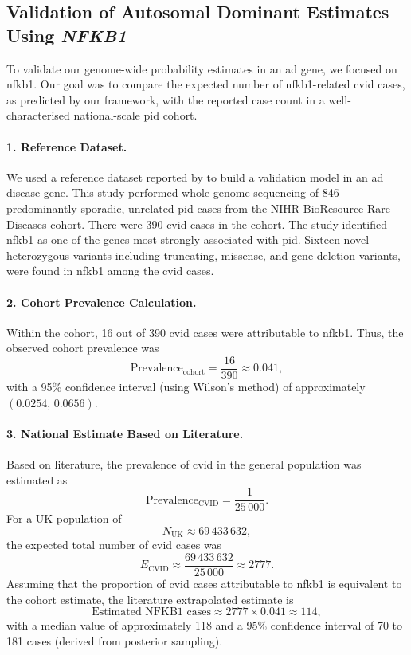 \subsection{Validation of Autosomal Dominant Estimates Using \textit{NFKB1}}

To validate our genome-wide probability estimates in an \ac{ad} gene, we focused on \ac{nfkb1}. Our goal was to compare the expected number of \ac{nfkb1}-related \ac{cvid} cases, as predicted by our framework, with the reported case count in a well-characterised national-scale \ac{pid} cohort.

\paragraph{1. Reference Dataset.}
We used a reference dataset reported by \citet{tuijnenburgNFKB12018} to build a validation model in an \ac{ad} disease gene. This study performed whole‐genome sequencing of 846 predominantly sporadic, unrelated \ac{pid} cases from the NIHR BioResource-Rare Diseases cohort. There were 390 \ac{cvid} cases in the cohort. The study identified \ac{nfkb1} as one of the genes most strongly associated with \ac{pid}. Sixteen novel heterozygous variants including truncating, missense, and gene deletion variants, were found in \ac{nfkb1} among the \ac{cvid} cases.

\paragraph{2. Cohort Prevalence Calculation.}
Within the cohort, 16 out of 390 \ac{cvid} cases were attributable to \ac{nfkb1}. Thus, the observed cohort prevalence was
\[
\text{Prevalence}_{\text{cohort}} = \frac{16}{390} \approx 0.041,
\]
with a 95\% confidence interval (using Wilson's method) of approximately \((0.0254,\,0.0656)\).

\paragraph{3. National Estimate Based on Literature.}
Based on literature, the prevalence of \ac{cvid} in the general population was estimated as
\[
\text{Prevalence}_{\text{CVID}} = \frac{1}{25\,000}.
\]
For a UK population of 
\[
N_{\text{UK}} \approx 69\,433\,632,
\]
the expected total number of \ac{cvid} cases was
\[
E_{\text{CVID}} \approx \frac{69\,433\,632}{25\,000} \approx 2777.
\]
Assuming that the proportion of \ac{cvid} cases attributable to \ac{nfkb1} is equivalent to the cohort estimate, the literature extrapolated estimate is
\[
\text{Estimated NFKB1 cases} \approx 2777 \times 0.041 \approx 114,
\]
with a median value of approximately 118 and a 95\% confidence interval of 70 to 181 cases (derived from posterior sampling).

